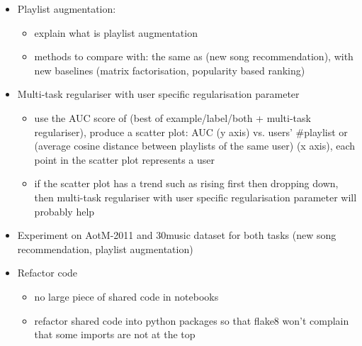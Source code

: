 \begin{itemize}
\item Playlist augmentation:
      \begin{itemize}
      \item explain what is playlist augmentation
      \item methods to compare with: the same as (new song recommendation), with new baselines (matrix factorisation, popularity based ranking)
      \end{itemize}

\item Multi-task regulariser with user specific regularisation parameter
      \begin{itemize}
      \item use the AUC score of (best of example/label/both + multi-task regulariser), 
            produce a scatter plot: AUC (y axis) vs. users' \#playlist or (average cosine distance between playlists of the same user) (x axis),
            each point in the scatter plot represents a user
      \item if the scatter plot has a trend such as rising first then dropping down, 
            then multi-task regulariser with user specific regularisation parameter will probably help
      \end{itemize}

\item Experiment on AotM-2011 and 30music dataset for both tasks (new song recommendation, playlist augmentation)

\item Refactor code 
      \begin{itemize}
      \item no large piece of shared code in notebooks
      \item refactor shared code into python packages so that flake8 won't complain that some imports are not at the top
      \end{itemize}
\end{itemize}
